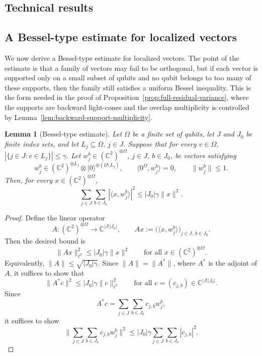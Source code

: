\documentclass[12pt]{article}
\newtheorem{lemma}[theorem]{Lemma}
\newcommand{\C}{\mathbb{C}}
\begin{document}
\begin{appendix}



\section{Technical results}

\subsection{A Bessel-type estimate for localized vectors}
\label{ssec:AuxTechnical}

We now derive a Bessel-type estimate for localized vectors. The point of the
estimate is that a family of vectors may fail to be orthogonal, but if each
vector is supported only on a small subset of qubits and no qubit belongs to too
many of these supports, then the family still satisfies a uniform Bessel
inequality. This is the form needed in the proof of
Proposition~\ref{prop:full-residual-variance}, where the supports are backward
light-cones and the overlap multiplicity is controlled by
Lemma~\ref{lem:backward-support-multiplicity}.

\begin{lemma}[Bessel-type estimate]
\label{lem:bessel-type-ineq}
Let \(\Omega\) be a finite set of qubits, let \(J\) and \(J_0\) be finite index sets, and
let \(L_j\subseteq\Omega\), \(j\in J\). Suppose that for every \(v\in\Omega\), $|\{j\in J:v\in L_j\} |\le \gamma$. Let \(w_j^b\in(\C^2)^{\otimes \Omega}\), \(j\in J\), \(b\in J_0\), be
vectors satisfying
\[
w_j^b\in
(\C^2)^{\otimes L_j}
\otimes
|0\rangle^{\otimes(\Omega\setminus L_j)},
\qquad
\langle 0^\Omega,w_j^b\rangle=0,
\qquad
\|w_j^b\|\le 1.
\]
Then, for every \(x\in(\C^2)^{\otimes \Omega}\),
\[
\sum_{j\in J}\sum_{b\in J_0}
|\langle x,w_j^b\rangle|^2
\le
|J_0|\gamma\|x\|^2.
\]
\end{lemma}

\begin{proof}
Define the linear operator
\[
A:(\C^2)^{\otimes \Omega}\to \C^{|J||J_0|},
\qquad
Ax:=\bigl(\langle x,w_j^b\rangle\bigr)_{j\in J, ~b\in J_0}.
\]
Then the desired bound is
\[
\|Ax\|_{\ell^2}^{2}
\le
|J_0|\gamma\|x\|^{2}
\qquad
\text{for all }x\in(\C^2)^{\otimes \Omega}.
\]
Equivalently, \(\|A\|\le \sqrt{|J_0|\gamma}\). Since \(\|A\|=\|A^*\|\), where \(A^*\) is the adjoint of \(A\), it suffices to show that
\[
\|A^*c\|^{2}
\le
|J_0|\gamma\|c\|_{\ell^2}^{2}
\qquad
\text{for all }c=(c_{j,b})\in\C^{|J||J_0|}.
\]
Since
\[
A^*c
=
\sum_{j\in J}\sum_{b\in J_0} c_{j,b}w_j^b,
\]
it suffices to show
\[
\bigg\|
\sum_{j\in J}\sum_{b\in J_0} c_{j,b}w_j^b
\bigg\|^2
\le
|J_0|\gamma
\sum_{j\in J}\sum_{b\in J_0} |c_{j,b}|^2.
\]


\end{proof}
\end{appendix}
\end{document}
